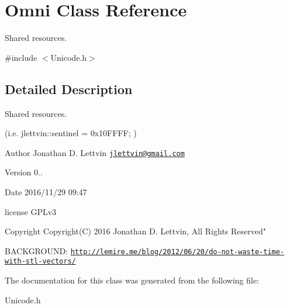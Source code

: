 \hypertarget{class_omni}{}\section{Omni Class Reference}
\label{class_omni}


Shared resources.  




{\ttfamily \#include $<$Unicode.\+h$>$}



\subsection{Detailed Description}
Shared resources. 

(i.\+e. jlettvin\+::sentinel = 0x10\+F\+F\+F\+F; )

\begin{DoxyAuthor}{Author}
Jonathan D. Lettvin \href{mailto:jlettvin@gmail.com}{\tt jlettvin@gmail.\+com}
\end{DoxyAuthor}
\begin{DoxyVersion}{Version}
0..
\end{DoxyVersion}
\begin{DoxyDate}{Date}
2016/11/29 09\+:47
\end{DoxyDate}
license G\+P\+Lv3

\begin{DoxyCopyright}{Copyright}
Copyright(\+C) 2016 Jonathan D. Lettvin, All Rights Reserved"
\end{DoxyCopyright}
B\+A\+C\+K\+G\+R\+O\+U\+N\+D\+: \href{http://lemire.me/blog/2012/06/20/do-not-waste-time-with-stl-vectors/}{\tt http\+://lemire.\+me/blog/2012/06/20/do-\/not-\/waste-\/time-\/with-\/stl-\/vectors/} 

The documentation for this class was generated from the following file\+:\begin{DoxyCompactItemize}
\item 
Unicode.\+h\end{DoxyCompactItemize}
